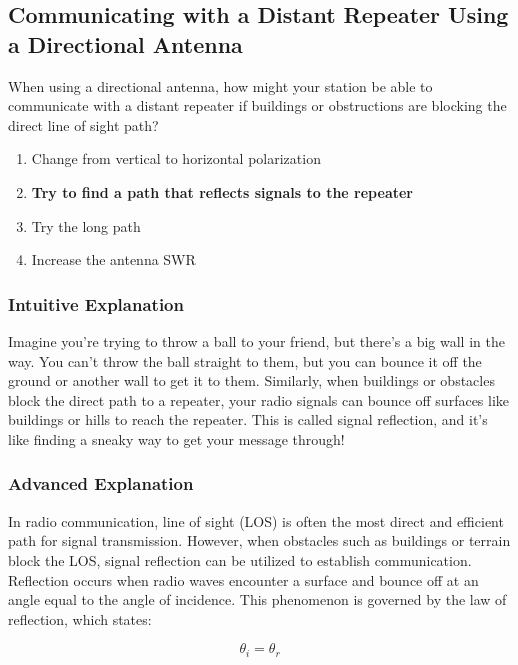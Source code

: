 \subsection{Communicating with a Distant Repeater Using a Directional Antenna}
\label{T3A05}

\begin{tcolorbox}[colback=gray!10!white,colframe=black!75!black,title=T3A05]
When using a directional antenna, how might your station be able to communicate with a distant repeater if buildings or obstructions are blocking the direct line of sight path?
\begin{enumerate}[label=\Alph*)]
    \item Change from vertical to horizontal polarization
    \item \textbf{Try to find a path that reflects signals to the repeater}
    \item Try the long path
    \item Increase the antenna SWR
\end{enumerate}
\end{tcolorbox}

\subsubsection{Intuitive Explanation}
Imagine you're trying to throw a ball to your friend, but there's a big wall in the way. You can't throw the ball straight to them, but you can bounce it off the ground or another wall to get it to them. Similarly, when buildings or obstacles block the direct path to a repeater, your radio signals can bounce off surfaces like buildings or hills to reach the repeater. This is called signal reflection, and it’s like finding a sneaky way to get your message through!

\subsubsection{Advanced Explanation}
In radio communication, line of sight (LOS) is often the most direct and efficient path for signal transmission. However, when obstacles such as buildings or terrain block the LOS, signal reflection can be utilized to establish communication. Reflection occurs when radio waves encounter a surface and bounce off at an angle equal to the angle of incidence. This phenomenon is governed by the law of reflection, which states:

\[
\theta_i = \theta_r
\]


